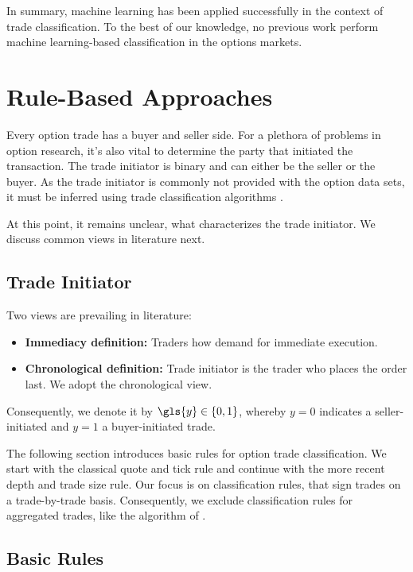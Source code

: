 In summary, machine learning has been applied successfully in the context of trade classification. To the best of our knowledge, no previous work perform machine learning-based classification in the options markets.

\newpage
\section{Rule-Based Approaches}\label{sec:rule-based-approaches}

Every option trade has a buyer and seller side. For a plethora of problems in option research, it's also vital to determine the party that initiated the transaction. The trade initiator is binary and can either be the seller or the buyer. As the trade initiator is commonly not provided with the option data sets, it must be inferred using trade classification algorithms \autocite[][453]{easleyOptionVolumeStock1998}.

At this point, it remains unclear, what characterizes the trade initiator. We discuss common views in literature next.

\subsection{Trade Initiator}\label{sec:trade-initiator}

Two views are prevailing in literature:
\begin{itemize}
	\item \textbf{Immediacy definition:} Traders how demand for immediate execution.
	\item \textbf{Chronological definition:} Trade initiator is the trader who places the order last. We adopt the chronological view.
\end{itemize}

Consequently, we denote it by $\gls{y} \in \{0,1\}$, whereby $y=0$ indicates a seller-initiated and $y=1$ a buyer-initiated trade.

The following section introduces basic rules for option trade classification. We start with the classical quote and tick rule and continue with the more recent depth and trade size rule. Our focus is on classification rules, that sign trades on a trade-by-trade basis. Consequently, we exclude classification rules for aggregated trades, like the  algorithm of \textcite[][1466--1468]{easleyFlowToxicityLiquidity2012}.

\subsection{Basic Rules}\label{sec:basic-rules}

